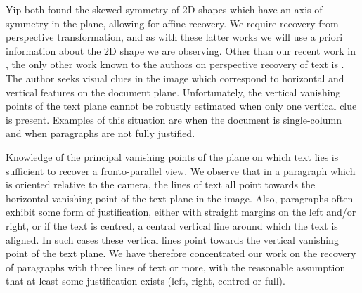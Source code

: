 \documentclass{article}
\begin{document}
Yip \cite{yip} both found the skewed symmetry of 2D shapes which have an axis of
symmetry in the plane, allowing for affine recovery.  We require recovery from
perspective transformation, and as with these latter works we will use a priori
information about the 2D shape we are observing.
Other than our recent work in \cite{clark-ijdar-2001}, the only other work known to the authors on perspective recovery of text is \cite{pilucvpr1}.  The author seeks visual clues in the image which correspond to horizontal and vertical features on the document plane.  Unfortunately, the vertical vanishing points of the text plane cannot be robustly estimated when only one vertical clue is present.  Examples of this situation are when the document is single-column and when paragraphs are not fully justified.

Knowledge of the principal vanishing points of the plane on which text lies is
sufficient to recover a fronto-parallel view.  We observe that in a paragraph
which is oriented relative to the camera, the lines of text all point towards
the horizontal vanishing point of the text plane in the image.  Also, paragraphs
often exhibit some form of justification, either with straight margins on the
left and/or right, or if the text is centred, a central vertical line around which
the text is aligned.  In such cases these vertical lines point towards the
vertical vanishing point of the text plane.  We have therefore concentrated our
work on the recovery of paragraphs with three lines of text or more, with 
the reasonable assumption that at least some justification exists (left, 
right, centred or full).
\end{document}
